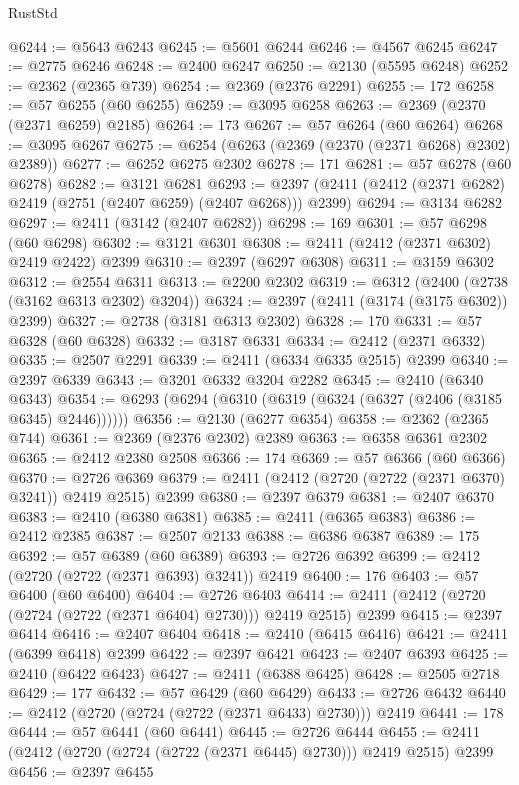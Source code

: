 \begin{lexlean}{RustStd}
\begin{coremodule}
@6244 := @5643 @6243
@6245 := @5601 @6244
@6246 := @4567 @6245
@6247 := @2775 @6246
@6248 := @2400 @6247
@6250 := @2130 (@5595 @6248)
@6252 := @2362 (@2365 @739)
@6254 := @2369 (@2376 @2291)
@6255 := 172
@6258 := @57 @6255 (@60 @6255)
@6259 := @3095 @6258
@6263 := @2369 (@2370 (@2371 @6259) @2185)
@6264 := 173
@6267 := @57 @6264 (@60 @6264)
@6268 := @3095 @6267
@6275 := @6254 (@6263 (@2369 (@2370 (@2371 @6268) @2302) @2389))
@6277 := @6252 @6275 @2302
@6278 := 171
@6281 := @57 @6278 (@60 @6278)
@6282 := @3121 @6281
@6293 := @2397 (@2411 (@2412 (@2371 @6282) @2419 (@2751 (@2407 @6259) (@2407 @6268))) @2399)
@6294 := @3134 @6282
@6297 := @2411 (@3142 (@2407 @6282))
@6298 := 169
@6301 := @57 @6298 (@60 @6298)
@6302 := @3121 @6301
@6308 := @2411 (@2412 (@2371 @6302) @2419 @2422) @2399
@6310 := @2397 (@6297 @6308)
@6311 := @3159 @6302
@6312 := @2554 @6311
@6313 := @2200 @2302
@6319 := @6312 (@2400 (@2738 (@3162 @6313 @2302) @3204))
@6324 := @2397 (@2411 (@3174 (@3175 @6302)) @2399)
@6327 := @2738 (@3181 @6313 @2302)
@6328 := 170
@6331 := @57 @6328 (@60 @6328)
@6332 := @3187 @6331
@6334 := @2412 (@2371 @6332)
@6335 := @2507 @2291
@6339 := @2411 (@6334 @6335 @2515) @2399
@6340 := @2397 @6339
@6343 := @3201 @6332 @3204 @2282
@6345 := @2410 (@6340 @6343)
@6354 := @6293 (@6294 (@6310 (@6319 (@6324 (@6327 (@2406 (@3185 @6345) @2446))))))
@6356 := @2130 (@6277 @6354)
@6358 := @2362 (@2365 @744)
@6361 := @2369 (@2376 @2302) @2389
@6363 := @6358 @6361 @2302
@6365 := @2412 @2380 @2508
@6366 := 174
@6369 := @57 @6366 (@60 @6366)
@6370 := @2726 @6369
@6379 := @2411 (@2412 (@2720 (@2722 (@2371 @6370) @3241)) @2419 @2515) @2399
@6380 := @2397 @6379
@6381 := @2407 @6370
@6383 := @2410 (@6380 @6381)
@6385 := @2411 (@6365 @6383)
@6386 := @2412 @2385
@6387 := @2507 @2133
@6388 := @6386 @6387
@6389 := 175
@6392 := @57 @6389 (@60 @6389)
@6393 := @2726 @6392
@6399 := @2412 (@2720 (@2722 (@2371 @6393) @3241)) @2419
@6400 := 176
@6403 := @57 @6400 (@60 @6400)
@6404 := @2726 @6403
@6414 := @2411 (@2412 (@2720 (@2724 (@2722 (@2371 @6404) @2730))) @2419 @2515) @2399
@6415 := @2397 @6414
@6416 := @2407 @6404
@6418 := @2410 (@6415 @6416)
@6421 := @2411 (@6399 @6418) @2399
@6422 := @2397 @6421
@6423 := @2407 @6393
@6425 := @2410 (@6422 @6423)
@6427 := @2411 (@6388 @6425)
@6428 := @2505 @2718
@6429 := 177
@6432 := @57 @6429 (@60 @6429)
@6433 := @2726 @6432
@6440 := @2412 (@2720 (@2724 (@2722 (@2371 @6433) @2730))) @2419
@6441 := 178
@6444 := @57 @6441 (@60 @6441)
@6445 := @2726 @6444
@6455 := @2411 (@2412 (@2720 (@2724 (@2722 (@2371 @6445) @2730))) @2419 @2515) @2399
@6456 := @2397 @6455

\end{coremodule}
\end{lexlean}
